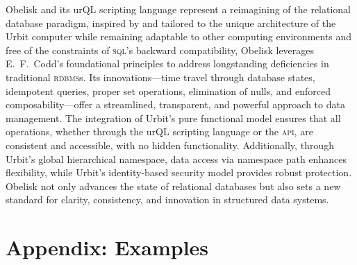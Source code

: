 \documentclass[twoside]{article}
\begin{document}
Obelisk and its urQL scripting language represent a reimagining of the relational database paradigm, inspired by and tailored to the unique architecture of the Urbit computer while remaining adaptable to other computing environments and free of the constraints of \textsc{sql}’s backward compatibility, Obelisk leverages E.\ F.\ Codd’s foundational principles to address longstanding deficiencies in traditional \textsc{rdbms}s. Its innovations—time travel through database states, idempotent queries, proper set operations, elimination of nulls, and enforced composability—offer a streamlined, transparent, and powerful approach to data management. The integration of Urbit’s pure functional model ensures that all operations, whether through the urQL scripting language or the \textsc{api}, are consistent and accessible, with no hidden functionality. Additionally, through Urbit's global hierarchical namespace, data access via namespace path enhances flexibility, while Urbit’s identity-based security model provides robust protection. Obelisk not only advances the state of relational databases but also sets a new standard for clarity, consistency, and innovation in structured data systems.\tombstone

\newpage
\section*{Appendix:  Examples}
\end{document}
